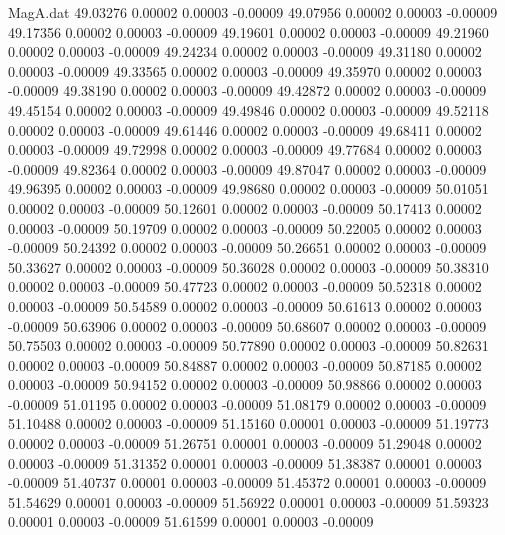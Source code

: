 \begin{filecontents}{MagA.dat}
  49.03276    0.00002    0.00003   -0.00009
  49.07956    0.00002    0.00003   -0.00009
  49.17356    0.00002    0.00003   -0.00009
  49.19601    0.00002    0.00003   -0.00009
  49.21960    0.00002    0.00003   -0.00009
  49.24234    0.00002    0.00003   -0.00009
  49.31180    0.00002    0.00003   -0.00009
  49.33565    0.00002    0.00003   -0.00009
  49.35970    0.00002    0.00003   -0.00009
  49.38190    0.00002    0.00003   -0.00009
  49.42872    0.00002    0.00003   -0.00009
  49.45154    0.00002    0.00003   -0.00009
  49.49846    0.00002    0.00003   -0.00009
  49.52118    0.00002    0.00003   -0.00009
  49.61446    0.00002    0.00003   -0.00009
  49.68411    0.00002    0.00003   -0.00009
  49.72998    0.00002    0.00003   -0.00009
  49.77684    0.00002    0.00003   -0.00009
  49.82364    0.00002    0.00003   -0.00009
  49.87047    0.00002    0.00003   -0.00009
  49.96395    0.00002    0.00003   -0.00009
  49.98680    0.00002    0.00003   -0.00009
  50.01051    0.00002    0.00003   -0.00009
  50.12601    0.00002    0.00003   -0.00009
  50.17413    0.00002    0.00003   -0.00009
  50.19709    0.00002    0.00003   -0.00009
  50.22005    0.00002    0.00003   -0.00009
  50.24392    0.00002    0.00003   -0.00009
  50.26651    0.00002    0.00003   -0.00009
  50.33627    0.00002    0.00003   -0.00009
  50.36028    0.00002    0.00003   -0.00009
  50.38310    0.00002    0.00003   -0.00009
  50.47723    0.00002    0.00003   -0.00009
  50.52318    0.00002    0.00003   -0.00009
  50.54589    0.00002    0.00003   -0.00009
  50.61613    0.00002    0.00003   -0.00009
  50.63906    0.00002    0.00003   -0.00009
  50.68607    0.00002    0.00003   -0.00009
  50.75503    0.00002    0.00003   -0.00009
  50.77890    0.00002    0.00003   -0.00009
  50.82631    0.00002    0.00003   -0.00009
  50.84887    0.00002    0.00003   -0.00009
  50.87185    0.00002    0.00003   -0.00009
  50.94152    0.00002    0.00003   -0.00009
  50.98866    0.00002    0.00003   -0.00009
  51.01195    0.00002    0.00003   -0.00009
  51.08179    0.00002    0.00003   -0.00009
  51.10488    0.00002    0.00003   -0.00009
  51.15160    0.00001    0.00003   -0.00009
  51.19773    0.00002    0.00003   -0.00009
  51.26751    0.00001    0.00003   -0.00009
  51.29048    0.00002    0.00003   -0.00009
  51.31352    0.00001    0.00003   -0.00009
  51.38387    0.00001    0.00003   -0.00009
  51.40737    0.00001    0.00003   -0.00009
  51.45372    0.00001    0.00003   -0.00009
  51.54629    0.00001    0.00003   -0.00009
  51.56922    0.00001    0.00003   -0.00009
  51.59323    0.00001    0.00003   -0.00009
  51.61599    0.00001    0.00003   -0.00009

\end{filecontents}
